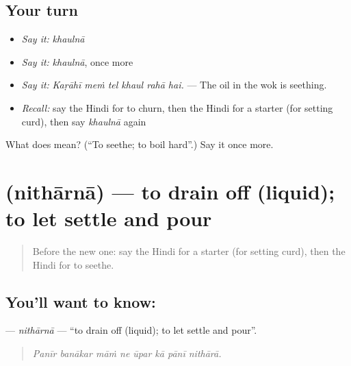 \subsection*{Your turn}
\begin{itemize}
\raggedright
  \item \emph{Say it:} \emph{khaulnā}
  \item \emph{Say it:} \emph{khaulnā}, once more
  \item \emph{Say it:} \emph{Kaṛāhī meṁ tel khaul rahā hai.} — The oil in the wok is seething.
  \item \emph{Recall:} say the Hindi for to churn, then the Hindi for a starter (for setting curd), then say \emph{khaulnā} again
\end{itemize}

\begin{tcolorbox}[breakable,colback=teal!4,colframe=teal!35!black,title={Before you move on}]
What does  mean? (\textquotedblleft{}To seethe; to boil hard\textquotedblright{}.) Say it once more.
\end{tcolorbox}
\section[\texorpdfstring{\hi{निथारना} (nithārnā)}{निथारना (nithārnā)}]{ (nithārnā) — to drain off (liquid); to let settle and pour}

\label{lesson:HI-C522-nitharna}



\begin{quote}
Before the new one: say the Hindi for a starter (for setting curd), then the Hindi for to seethe.
\end{quote}

\subsection*{You'll want to know: }
\textbf{} — \emph{nithārnā} — \textquotedblleft{}to drain off (liquid); to let settle and pour\textquotedblright{}.

\begin{quote}
       
\end{quote}

\begin{quote}
\emph{Panīr banākar māṁ ne ūpar kā pānī nithārā.}
\end{quote}

